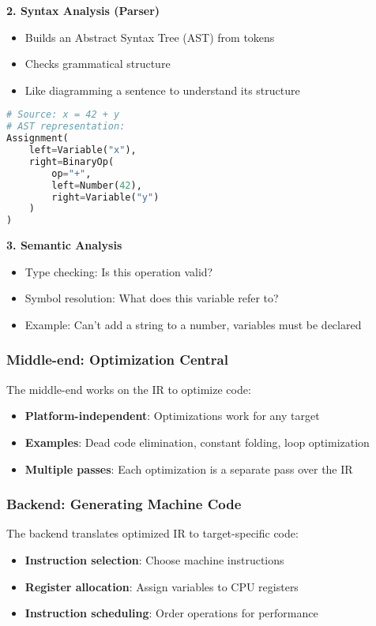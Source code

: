 \documentclass[11pt,a4paper]{article}
\begin{document}
\textbf{2. Syntax Analysis (Parser)}
\begin{itemize}
    \item Builds an Abstract Syntax Tree (AST) from tokens
    \item Checks grammatical structure
    \item Like diagramming a sentence to understand its structure
\end{itemize}

\begin{lstlisting}[language=Python, caption=Simple AST Example]
# Source: x = 42 + y
# AST representation:
Assignment(
    left=Variable("x"),
    right=BinaryOp(
        op="+",
        left=Number(42),
        right=Variable("y")
    )
)
\end{lstlisting}

\textbf{3. Semantic Analysis}
\begin{itemize}
    \item Type checking: Is this operation valid?
    \item Symbol resolution: What does this variable refer to?
    \item Example: Can't add a string to a number, variables must be declared
\end{itemize}

\subsubsection{Middle-end: Optimization Central}

The middle-end works on the IR to optimize code:
\begin{itemize}
    \item \textbf{Platform-independent}: Optimizations work for any target
    \item \textbf{Examples}: Dead code elimination, constant folding, loop optimization
    \item \textbf{Multiple passes}: Each optimization is a separate pass over the IR
\end{itemize}

\subsubsection{Backend: Generating Machine Code}

The backend translates optimized IR to target-specific code:
\begin{itemize}
    \item \textbf{Instruction selection}: Choose machine instructions
    \item \textbf{Register allocation}: Assign variables to CPU registers
    \item \textbf{Instruction scheduling}: Order operations for performance
\end{itemize}
\end{document}
